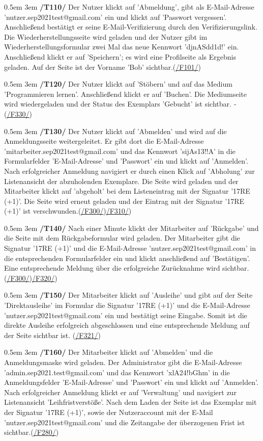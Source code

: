 \documentclass{article}
\newcommand{\specification}[3]{
	{\parindent 0.5em \hangindent 3em \hypertarget{spec:#1:#2}{\textbf{/#1#2/}} #3 \par \nobreak \vspace*{0.5em}}
}
\begin{document}
\specification{T}{110}{Der Nutzer klickt auf 'Abmeldung', gibt als E-Mail-Adresse \linebreak  'nutzer.sep2021test@gmail.com' ein und klickt auf 'Passwort vergessen'. Anschließend \linebreak  bestätigt er seine E-Mail-Verifizierung durch den Verifizierungslink. Die Wiederherstellungsseite wird geladen und der Nutzer gibt im Wiederherstellungsformular zwei Mal das neue Kennwort 'djnASdd1d!' ein. Anschließend klickt er auf 'Speichern'; es wird eine Profilseite als Ergebnis geladen. Auf der Seite ist der Vorname 'Bob' sichtbar.­(\hyperlink{spec:F:101}{/F101/})}
\specification{T}{120}{Der Nutzer klickt auf 'Stöbern' und auf das Medium 'Programmieren lernen'. Anschließend klickt er auf 'Buchen'. Die Mediumseite wird wiedergeladen und der Status des Exemplars 'Gebucht' ist sichtbar. ­­ (\hyperlink{spec:F:330}{/F330/})}
\specification{T}{130}{Der Nutzer klickt auf 'Abmelden' und wird auf die Anmeldungsseite weitergeleitet. Er gibt dort die E-Mail-Adresse 'mitarbeiter.sep2021test@gmail.com' und das Kennwort 'sijAs13!!A' in die Formularfelder 'E-Mail-Adresse' und 'Passwort' ein und klickt auf 'Anmelden'. Nach erfolgreicher Anmeldung navigiert er durch einen Klick auf 'Abholung' zur Listenansicht der abzuholenden Exemplare. Die Seite wird geladen und der Mitarbeiter klickt auf 'abgeholt' bei dem Listeneintrag mit der Signatur '17RE (+1)'. Die Seite wird erneut geladen und der Eintrag mit der Signatur '17RE (+1)' ist verschwunden.(\hyperlink{spec:F:300}{/F300/})\hyperlink{spec:F:310}{/F310/}) }
\specification{T}{140}{Nach einer Minute klickt der Mitarbeiter auf 'Rückgabe' und die Seite mit dem Rückgabeformular wird geladen. Der Mitarbeiter gibt die Signatur '17RE (+1)' und die E-Mail-Adresse \linebreak 'nutzer.sep2021test@gmail.com' in die entsprechenden Formularfelder ein und klickt anschließend auf \linebreak 'Bestätigen'. Eine entsprechende Meldung über die erfolgreiche Zurücknahme wird sichtbar. (\hyperlink{spec:F:300}{/F300/})\hyperlink{spec:F:320}{/F320/}) }
\specification{T}{150}{Der Mitarbeiter klickt auf 'Ausleihe' und gibt auf der Seite 'Direktausleihe' im Formular die Signatur '17RE (+1)' und die E-Mail-Adresse 'nutzer.sep2021test@gmail.com' ein und bestätigt seine Eingabe. Somit ist die direkte Ausleihe erfolgreich abgeschlossen und eine entsprechende Meldung auf der Seite sichtbar ist. (\hyperlink{spec:F:321}{/F321/})}
\specification{T}{160}{Der Mitarbeiter klickt auf 'Abmelden' und die Anmeldungsmaske wird geladen. Der Administrator gibt die E-Mail-Adresse 'admin.sep2021.test@gmail.com' und das Kennwort 'xlA24!bGhm' in die Anmeldungsfelder 'E-Mail-Adresse' und 'Passwort' ein und klickt auf 'Anmelden'. Nach erfolgreicher Anmeldung klickt er auf 'Verwaltung' und navigiert zur Listenansicht 'Leihfristverstöße'. Nach dem Laden der Seite ist das Exemplar mit der Signatur '17RE (+1)', sowie der Nutzeraccount mit der E-Mail 'nutzer.sep2021test@gmail.com' und die Zeitangabe der überzogenen Frist ist sichtbar.(\hyperlink{spec:F:280}{/F280/})}
\end{document}
